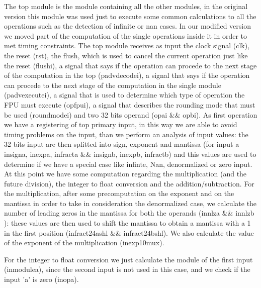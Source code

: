 The top module is the module containing all the other modules, in the original version this module was used just to execute some common calculations to all the operations such as the detection of infinite or nan cases. In our modified version we moved part of the computation of the single operations inside it in order to met timing constraints.
The top module receives as input the clock signal (clk), the reset (rst), the flush, which is used to cancel the current operation just like the reset (flush\textunderscore i), a signal that says if the operation can procede to the next stage of the computation in the top (padv\textunderscore decode\textunderscore i), a signal that says if the operation can procede to the next stage of the computation in the single module (padv\textunderscore execute\textunderscore i), a signal that is used to determine which type of operation the FPU must execute (op\textunderscore fpu\textunderscore i), a signal that describes the rounding mode that must be used (round\textunderscore mode\textunderscore i) and two 32 bits operand (opa\textunderscore i \&\& opb\textunderscore i).
As first operation we have a registering of top primary input, in this way we are able to avoid timing problems on the input, than we perform an analysis of input values: the 32 bits input are then splitted into sign, exponent and mantissa (for input a in\textunderscore signa, in\textunderscore expa, in\textunderscore fracta \&\& in\textunderscore signb, in\textunderscore expb, in\textunderscore fractb) and this values are used to determine if we have a special case like infinte, Nan, denormalized or zero input.
At this point we have some computation regarding the multiplication (and the future division), the integer to float conversion and the addition/subtraction. 
For the multiplication, after some precomputation on the exponent and on the mantissa in order to take in consideration the denormalized case, we calculate the number of leading zeros in the mantissa for both the operands (in\textunderscore nlza \&\& in\textunderscore nlzb ): these values are then used to shift the mantissa to obtain a mantissa with a 1 in the first position (in\textunderscore fract24a\textunderscore shl \&\& in\textunderscore fract24b\textunderscore shl). We also calculate the value of the exponent of the multiplication (in\textunderscore exp10mux). 

For the integer to float conversion we just calculate the module of the first input (in\textunderscore module\textunderscore a), since the second input is not used in this case, and we check if the input 'a' is zero (in\textunderscore opa).

